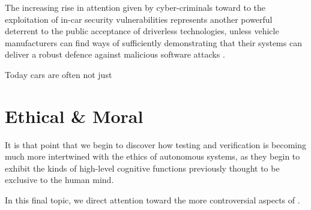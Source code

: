 \documentclass[conference]{IEEEtran}
\begin{document}
The increasing rise in attention given by cyber-criminals toward to the exploitation of in-car security vulnerabilities represents another powerful deterrent to the public acceptance of driverless technologies, unless vehicle manufacturers can find ways of sufficiently demonstrating that their systems can deliver a robust defence against malicious software attacks \cite{yagdereli}.

Today cars are often not just 









 \section{Ethical \& Moral}
 
 
 It is that point that we begin to discover how testing and verification is becoming much more intertwined with the ethics of autonomous systems, as they begin to exhibit the kinds of high-level cognitive functions previously thought to be exclusive to the human mind.
 
 In this final topic, we direct attention toward the more controversial aspects of .
 

%
%
\end{document}
